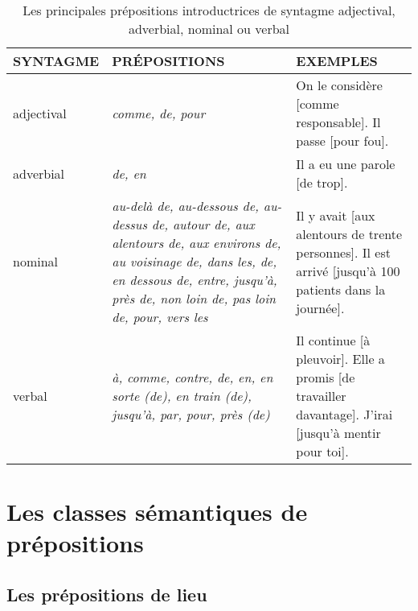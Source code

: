 \documentclass[UTF8]{report}
\begin{document}
\begin{table}[H]
    \centering
    \small
    \setlength{\extrarowheight}{2pt} %
    \begin{tabular}{|>{\raggedright\arraybackslash}p{}|>{\raggedright\arraybackslash}p{}|>{\raggedright\arraybackslash}p{}|}
        \hline
        \rowcolor{cyan!20} %
        \textbf{SYNTAGME} & \textbf{PRÉPOSITIONS} & \textbf{EXEMPLES} \\
        \hline
        adjectival & \textit{comme, de, pour} & On le considère [comme responsable]. \newline Il passe [pour fou]. \\
        \hline
        adverbial & \textit{de, en} & Il a eu une parole [de trop]. \\
        \hline
        nominal & \textit{au-delà de, au-dessous de, au-dessus de, autour de, aux alentours de, aux environs de, au voisinage de, dans les, de, en dessous de, entre, jusqu'à, près de, non loin de, pas loin de, pour, vers les} & Il y avait [aux alentours de trente personnes]. \newline Il est arrivé [jusqu'à 100 patients dans la journée]. \\
        \hline
        verbal & \textit{à, comme, contre, de, en, en sorte (de), en train (de), jusqu'à, par, pour, près (de)} & Il continue [à pleuvoir]. \newline Elle a promis [de travailler davantage]. \newline J'irai [jusqu'à mentir pour toi]. \\
        \hline
    \end{tabular}
    \caption{ Les principales prépositions introductrices de syntagme adjectival, adverbial, nominal ou verbal}
\end{table}

\section{Les classes sémantiques de prépositions}
\subsection{Les prépositions de lieu}
\end{document}

